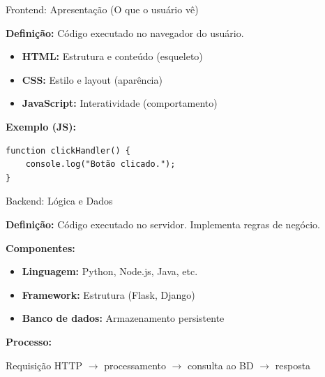 \documentclass{beamer}
\begin{document}
\begin{frame}[fragile]{Frontend: Apresentação (O que o usuário vê)}

\textbf{Definição:} Código executado no navegador do usuário.

\vspace{0.2cm}
\begin{itemize}
\item \textbf{HTML:} Estrutura e conteúdo (esqueleto)
\item \textbf{CSS:} Estilo e layout (aparência)
\item \textbf{JavaScript:} Interatividade (comportamento)
\end{itemize}

\vspace{0.2cm}
\textbf{Exemplo (JS):}

\begin{verbatim}
function clickHandler() {
    console.log("Botão clicado.");
}
\end{verbatim}

\end{frame}

\begin{frame}{Backend: Lógica e Dados}

\textbf{Definição:} Código executado no servidor. Implementa regras de negócio.

\vspace{0.2cm}
\textbf{Componentes:}
\begin{itemize}
\item \textbf{Linguagem:} Python, Node.js, Java, etc.
\item \textbf{Framework:} Estrutura (Flask, Django)
\item \textbf{Banco de dados:} Armazenamento persistente
\end{itemize}

\vspace{0.3cm}
\textbf{Processo:}

Requisição HTTP $\rightarrow$ processamento $\rightarrow$ consulta ao BD $\rightarrow$ resposta

\end{frame}
\end{document}

